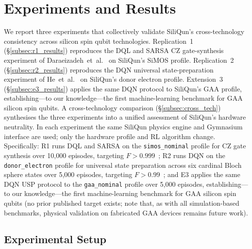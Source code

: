 
\section{Experiments and Results}
\label{sec:experiments}

We report three experiments that collectively validate SiliQun's
cross-technology consistency across silicon spin qubit technologies.
Replication~1 (\S\ref{subsec:r1_results}) reproduces the DQL and SARSA
CZ gate-synthesis experiment of Daraeizadeh~et~al.~\cite{Daraeizadeh2020}
on SiliQun's SiMOS profile.
Replication~2 (\S\ref{subsec:r2_results}) reproduces the DQN universal
state-preparation experiment of He~et~al.~\cite{He2021} on SiliQun's
donor electron profile.
Extension~3 (\S\ref{subsec:e3_results}) applies the same DQN protocol to
SiliQun's GAA profile, establishing---to our knowledge---the first
machine-learning benchmark for GAA silicon spin qubits.
A cross-technology comparison (\S\ref{subsec:cross_tech}) synthesises
the three experiments into a unified assessment of SiliQun's hardware
neutrality.
In each experiment the same SiliQun physics engine and Gymnasium interface are used; only the hardware profile and RL algorithm change.
Specifically: R1 runs DQL and SARSA on the \texttt{simos\_nominal} profile for CZ gate synthesis over 10{,}000 episodes, targeting $F > 0.999$~\cite{Daraeizadeh2020};
R2 runs DQN on the \texttt{donor\_electron} profile for universal state preparation across six cardinal Bloch sphere states over 5{,}000 episodes, targeting $F > 0.99$~\cite{He2021};
and E3 applies the same DQN USP protocol to the \texttt{gaa\_nominal} profile over 5{,}000 episodes, establishing---to our knowledge---the first machine-learning benchmark for GAA silicon spin qubits (no prior published target exists; note that, as with all simulation-based benchmarks, physical validation on fabricated GAA devices remains future work).

\subsection{Experimental Setup}
\label{subsec:setup}


